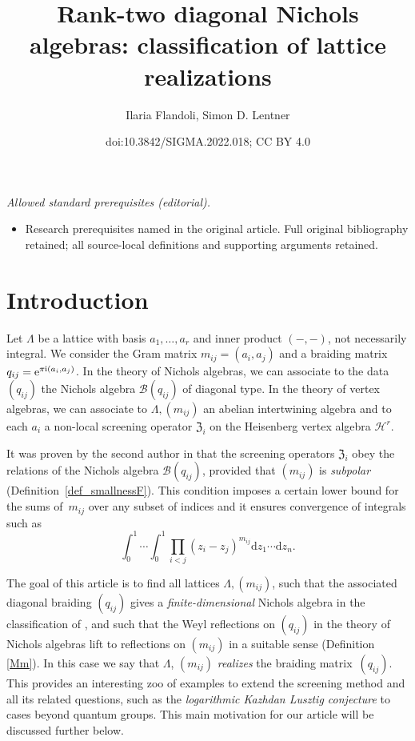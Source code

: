 \documentclass[10pt,a4paper]{amsart}
\title{Rank-two diagonal Nichols algebras: classification of lattice realizations}
\author{Ilaria Flandoli, Simon D. Lentner}
\date{doi:10.3842/SIGMA.2022.018; CC BY 4.0}
\numberwithin{equation}{section}
\newcommand{\zem}{\mathfrak{Z}}
\begin{document}
\maketitle
\noindent\textit{Allowed standard prerequisites (editorial).}\begin{itemize}
\item Research prerequisites named in the original article. Full original bibliography retained; all source-local definitions and supporting arguments retained.
\end{itemize}\medskip
\section{Introduction}
Let $\Lambda$ be a lattice with basis $a_1,\dots,a_r$ and inner product $(-,-)$, not necessarily integral. We consider the Gram matrix $m_{ij}=(a_i,a_j)$ and a braiding matrix $q_{ij}={\rm e}^{\pi {\rm i} (a_i,a_j)}$. In the theory of Nichols algebras, we can associate to the data $(q_{ij})$ the Nichols algebra $\mathcal{B}(q_{ij})$ of diagonal type. In the theory of vertex algebras, we can associate to $\Lambda,(m_{ij})$ an abelian intertwining algebra and to each $a_i$ a non-local screening operator $\zem_{i}$ on the Heisenberg vertex algebra $\mathcal{H}^r$.

 It was proven by the second author in \cite{Len17} that the screening operators $\zem_{i}$ obey the relations of the Nichols algebra $\mathcal{B}(q_{ij})$, provided that $(m_{ij})$ is \emph{subpolar} (Definition~\ref{def_smallnessF}). This condition imposes a certain lower bound for the sums of~$m_{ij}$ over any subset of indices and it ensures convergence of integrals such as
 \[\int_0^1\cdots\int_0^1 \prod_{i<j} (z_i-z_j)^{m_{ij}}\mathrm{d} z_1\cdots\mathrm{d}z_n.\]

The goal of this article is to find all lattices $\Lambda,(m_{ij})$, such that the associated diagonal braiding $(q_{ij})$ gives a \emph{finite-dimensional} Nichols algebra in the classification of \cite{Heck06}, and such that the Weyl reflections on $(q_{ij})$ in the theory of Nichols algebras lift to reflections on $(m_{ij})$ in a suitable sense (Definition \ref{Mm}). In this case we say that $\Lambda$, $(m_{ij})$ \emph{realizes} the braiding matrix~$(q_{ij})$. This provides an interesting zoo of examples to extend the screening method and all its related questions, such as the \emph{logarithmic Kazhdan Lusztig conjecture} to cases beyond quantum groups. This main motivation for our article will be discussed further below.
\end{document}
